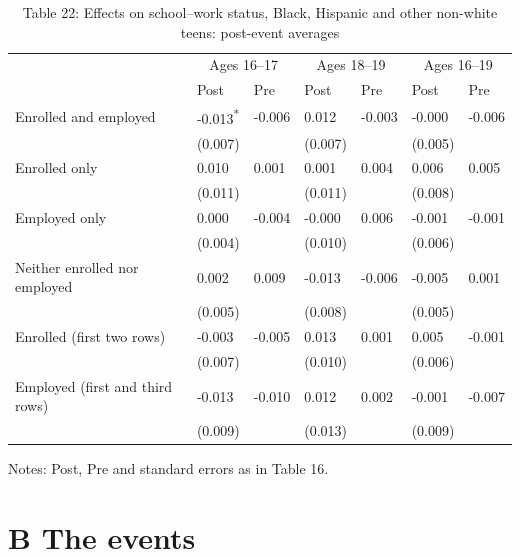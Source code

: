 \documentclass[12pt]{article}
\begin{document}
\begin{table}
\centering
\caption{Table 22: Effects on school--work status, Black, Hispanic and other non-white teens: post-event averages}

\small
\begin{tabular}{p{}p{}p{}p{}p{}p{}p{}}
\toprule
 & \multicolumn{2}{c}{Ages 16--17} & \multicolumn{2}{c}{Ages 18--19} & \multicolumn{2}{c}{Ages 16--19} \\

 & Post & Pre & Post & Pre & Post & Pre \\
\midrule
Enrolled and employed & -0.013\textsuperscript{*} & -0.006 & 0.012 & -0.003 & -0.000 & -0.006 \\
 & (0.007) &  & (0.007) &  & (0.005) &  \\
Enrolled only & 0.010 & 0.001 & 0.001 & 0.004 & 0.006 & 0.005 \\
 & (0.011) &  & (0.011) &  & (0.008) &  \\
Employed only & 0.000 & -0.004 & -0.000 & 0.006 & -0.001 & -0.001 \\
 & (0.004) &  & (0.010) &  & (0.006) &  \\
Neither enrolled nor employed & 0.002 & 0.009 & -0.013 & -0.006 & -0.005 & 0.001 \\
 & (0.005) &  & (0.008) &  & (0.005) &  \\
Enrolled (first two rows) & -0.003 & -0.005 & 0.013 & 0.001 & 0.005 & -0.001 \\
 & (0.007) &  & (0.010) &  & (0.006) &  \\
Employed (first and third rows) & -0.013 & -0.010 & 0.012 & 0.002 & -0.001 & -0.007 \\
 & (0.009) &  & (0.013) &  & (0.009) &  \\
\bottomrule
\end{tabular}



\noindent\small Notes: Post, Pre and standard errors as in Table 16.

\end{table}


\section{B The events}
\end{document}
